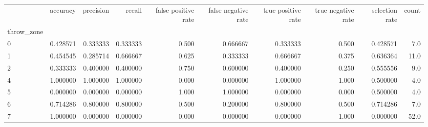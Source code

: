\begin{tabular}{lrrrrrrrrr}
\toprule
{} &  accuracy &  precision &    recall &  false positive rate &  false negative rate &  true positive rate &  true negative rate &  selection rate &  count \\
throw\_zone &           &            &           &                      &                      &                     &                     &                 &        \\
\midrule
0          &  0.428571 &   0.333333 &  0.333333 &                0.500 &             0.666667 &            0.333333 &               0.500 &        0.428571 &    7.0 \\
1          &  0.454545 &   0.285714 &  0.666667 &                0.625 &             0.333333 &            0.666667 &               0.375 &        0.636364 &   11.0 \\
2          &  0.333333 &   0.400000 &  0.400000 &                0.750 &             0.600000 &            0.400000 &               0.250 &        0.555556 &    9.0 \\
4          &  1.000000 &   1.000000 &  1.000000 &                0.000 &             0.000000 &            1.000000 &               1.000 &        0.500000 &    4.0 \\
5          &  0.000000 &   0.000000 &  0.000000 &                1.000 &             1.000000 &            0.000000 &               0.000 &        0.500000 &    4.0 \\
6          &  0.714286 &   0.800000 &  0.800000 &                0.500 &             0.200000 &            0.800000 &               0.500 &        0.714286 &    7.0 \\
7          &  1.000000 &   0.000000 &  0.000000 &                0.000 &             0.000000 &            0.000000 &               1.000 &        0.000000 &   52.0 \\
\bottomrule
\end{tabular}
